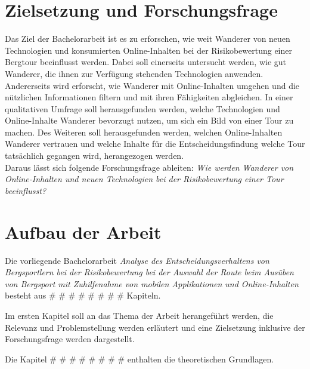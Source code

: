 

\section{Zielsetzung und Forschungsfrage}


Das Ziel der Bachelorarbeit ist es zu erforschen, wie weit  Wanderer von neuen Technologien und konsumierten Online-Inhalten bei der Risikobewertung einer Bergtour beeinflusst werden. Dabei soll einerseits untersucht werden, wie gut Wanderer, die ihnen zur Verfügung stehenden Technologien anwenden. Andererseits wird erforscht, wie Wanderer mit Online-Inhalten umgehen und die nützlichen Informationen filtern und mit ihren Fähigkeiten abgleichen. In einer qualitativen Umfrage soll herausgefunden werden, welche Technologien und Online-Inhalte Wanderer bevorzugt nutzen, um sich ein Bild von einer Tour zu machen. Des Weiteren soll herausgefunden werden, welchen Online-Inhalten Wanderer vertrauen und welche Inhalte für die Entscheidungsfindung welche Tour tatsächlich gegangen wird, herangezogen werden.\\
Daraus lässt sich folgende Forschungsfrage ableiten: 
\textit{Wie werden Wanderer von Online-Inhalten und neuen Technologien bei der Risikobewertung einer Tour beeinflusst?}

\section{Aufbau der Arbeit}

Die vorliegende Bachelorarbeit \textit{Analyse des Entscheidungsverhaltens von Bergsportlern bei der Risikobewertung bei der Auswahl der Route beim Ausüben von Bergsport mit Zuhilfenahme von mobilen Applikationen und Online-Inhalten} besteht aus \# \# \# \# \# \# \# \# Kapiteln.\par

Im ersten Kapitel soll an das Thema der Arbeit herangeführt werden, die Relevanz und Problemstellung werden erläutert und eine Zielsetzung inklusive der Forschungsfrage werden dargestellt.\par

Die Kapitel \# \# \# \# \# \# \# \# enthalten die theoretischen Grundlagen.\par

